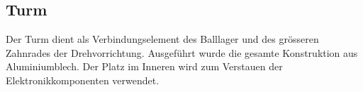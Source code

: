 \subsection{Turm}
Der Turm dient als Verbindungselement des Balllager und des grösseren 
Zahnrades der Drehvorrichtung. Ausgeführt wurde die gesamte Konstruktion aus 
Aluminiumblech. Der Platz im Inneren wird zum Verstauen der 
Elektronikkomponenten verwendet.
